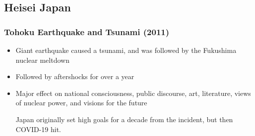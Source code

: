 \documentclass[class=article, crop=false]{standalone}
\begin{document}
  \subsection{Heisei Japan}
  \subsubsection{Tohoku Earthquake and Tsunami (2011)}
  \begin{itemize}
    \item Giant earthquake caused a tsunami, and was followed by the Fukushima nuclear meltdown
    \item Followed by aftershocks for over a year
    \item Major effect on national consciousness, public discourse, art, literature, views of nuclear power, and visions for the future
    \begin{note}{}
      Japan originally set high goals for a decade from the incident, but then COVID-19 hit.
    \end{note}
  \end{itemize}
\end{document}
